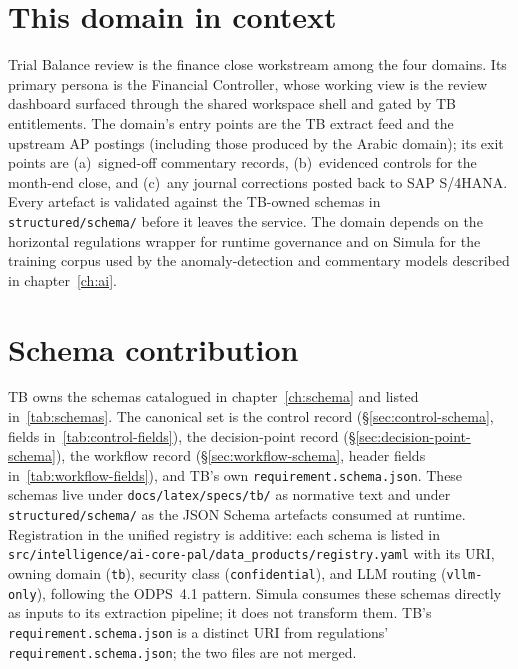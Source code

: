 \section{This domain in context}
\label{sec:agent-domain-context}
Trial Balance review is the finance close workstream among the four
domains. Its primary persona is the Financial Controller, whose
working view is the review dashboard surfaced through the shared
workspace shell and gated by TB entitlements. The domain's entry
points are the TB extract feed and the upstream AP postings
(including those produced by the Arabic domain); its exit points are
(a)~signed-off commentary records, (b)~evidenced controls for the
month-end close, and (c)~any journal corrections posted back to SAP
S/4HANA. Every artefact is validated against the TB-owned schemas in
\texttt{structured/schema/} before it leaves the service. The domain
depends on the horizontal regulations wrapper for runtime governance
and on Simula for the training corpus used by the anomaly-detection
and commentary models described in chapter~\ref{ch:ai}.

\section{Schema contribution}
\label{sec:agent-schema-contrib}
TB owns the schemas catalogued in chapter~\ref{ch:schema} and listed
in~\ref{tab:schemas}. The canonical set is the control record
(\S\ref{sec:control-schema}, fields in~\ref{tab:control-fields}), the
decision-point record (\S\ref{sec:decision-point-schema}), the
workflow record (\S\ref{sec:workflow-schema},
header fields in~\ref{tab:workflow-fields}), and TB's own
\texttt{requirement.schema.json}. These schemas live under
\texttt{docs/latex/specs/tb/} as normative text and under
\texttt{structured/schema/} as the JSON Schema artefacts consumed at
runtime. Registration in the unified registry is additive: each
schema is listed in
\texttt{src/intelligence/ai-core-pal/data\_products/registry.yaml}
with its URI, owning domain (\texttt{tb}), security class
(\texttt{confidential}), and LLM routing (\texttt{vllm-only}),
following the ODPS~4.1 pattern. Simula consumes these schemas
directly as inputs to its extraction pipeline; it does not transform
them. TB's \texttt{requirement.schema.json} is a distinct URI from
regulations' \texttt{requirement.schema.json}; the two files are not
merged.

